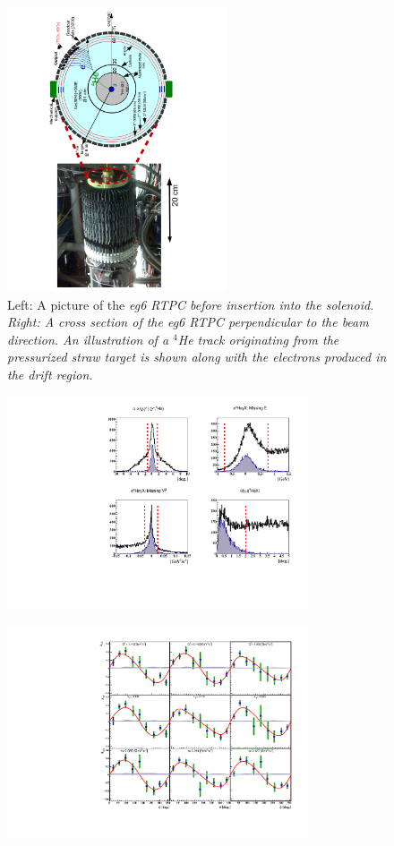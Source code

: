 \documentclass[nofootinbib,twocolumn,showpacs,prl,superscriptaddress,secnumarabic,amssymb,nobibnotes,aps,floatfix]{revtex4}
\begin{document}
\begin{figure}[tb]
\includegraphics[width=6.5cm,angle=-90]{figs/RTPC.pdf}
\vspace{-0.9cm}
\caption{Left: A picture of the \it{eg6} RTPC before insertion into the solenoid. Right: A cross section of the \it{eg6} RTPC perpendicular to the beam direction. An illustration of a $^4$He track originating from the pressurized straw target is shown along with the electrons produced in the drift region.}
\label{fig:RTPC}
\end{figure}

\begin{figure}[tb]
\includegraphics[width=8.9cm]{figs/coh_exc_cuts.pdf}
\vspace{-0.9cm}
\caption{}
\label{fig:kin-cuts}
\end{figure}


\begin{figure}[tb]
\includegraphics[width=8.9cm]{figs/coherent-ALU.pdf}
\vspace{-0.9cm}
\caption{}
\label{fig:alu}
\end{figure}
\end{document}
